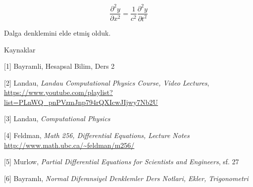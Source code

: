 \documentclass[12pt,fleqn]{article}\usepackage{../../common}
\begin{document}
$$
\frac{\partial^2 y}{\partial x^2}  =
\frac{1}{c^2}\frac{\partial^2 y}{\partial t^2}
$$

Dalga denklemini elde etmiş olduk.

Kaynaklar

[1] Bayramli, Hesapsal Bilim, Ders 2 

[2] Landau, {\em Landau Computational Physics Course, Video Lectures},
    \url{https://www.youtube.com/playlist?list=PLnWQ_pnPVzmJnp794rQXIcwJIjwy7Nb2U}

[3] Landau, {\em Computational Physics}

[4] Feldman, {\em Math 256, Differential Equations, Lecture Notes}
    \url{http://www.math.ubc.ca/~feldman/m256/}

[5] Murlow, {\em Partial Differential Equations for Scientists and Engineers}, sf. 27

[6] Bayramlı, {\em Normal Diferansiyel Denklemler Ders Notlari, Ekler, Trigonometri}
\end{document}
